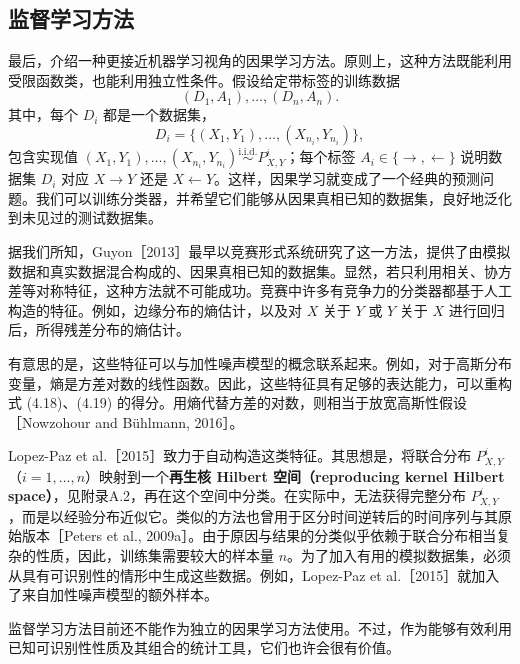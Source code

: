 \subsection{监督学习方法}

最后，介绍一种更接近机器学习视角的因果学习方法。原则上，这种方法既能利用受限函数类，也能利用独立性条件。假设给定带标签的训练数据
\[
 (D_1,A_1),\ldots,(D_n,A_n).
\]
其中，每个 $D_i$ 都是一个数据集，
\[
 D_i=\{(X_1,Y_1),\ldots,(X_{n_i},Y_{n_i})\},
\]
包含实现值 $(X_1,Y_1),\ldots,(X_{n_i},Y_{n_i})\overset{\mathrm{i.i.d.}}{\sim}P^i_{X,Y}$；每个标签 $A_i\in\{\to,\leftarrow\}$ 说明数据集 $D_i$ 对应 $X\to Y$ 还是 $X\leftarrow Y$。这样，因果学习就变成了一个经典的预测问题。我们可以训练分类器，并希望它们能够从因果真相已知的数据集，良好地泛化到未见过的测试数据集。

据我们所知，Guyon［2013］最早以竞赛形式系统研究了这一方法，提供了由模拟数据和真实数据混合构成的、因果真相已知的数据集。显然，若只利用相关、协方差等对称特征，这种方法就不可能成功。竞赛中许多有竞争力的分类器都基于人工构造的特征。例如，边缘分布的熵估计，以及对 $X$ 关于 $Y$ 或 $Y$ 关于 $X$ 进行回归后，所得残差分布的熵估计。

有意思的是，这些特征可以与加性噪声模型的概念联系起来。例如，对于高斯分布变量，熵是方差对数的线性函数。因此，这些特征具有足够的表达能力，可以重构式 (4.18)、(4.19) 的得分。用熵代替方差的对数，则相当于放宽高斯性假设［Nowzohour and Bühlmann, 2016］。

Lopez-Paz et al.［2015］致力于自动构造这类特征。其思想是，将联合分布 $P^i_{X,Y}$（$i=1,\ldots,n$）映射到一个\textbf{再生核 Hilbert 空间（reproducing kernel Hilbert space）}，见附录A.2，再在这个空间中分类。在实际中，无法获得完整分布 $P^i_{X,Y}$，而是以经验分布近似它。类似的方法也曾用于区分时间逆转后的时间序列与其原始版本［Peters et al., 2009a］。由于原因与结果的分类似乎依赖于联合分布相当复杂的性质，因此，训练集需要较大的样本量 $n$。为了加入有用的模拟数据集，必须从具有可识别性的情形中生成这些数据。例如，Lopez-Paz et al.［2015］就加入了来自加性噪声模型的额外样本。

监督学习方法目前还不能作为独立的因果学习方法使用。不过，作为能够有效利用已知可识别性性质及其组合的统计工具，它们也许会很有价值。
